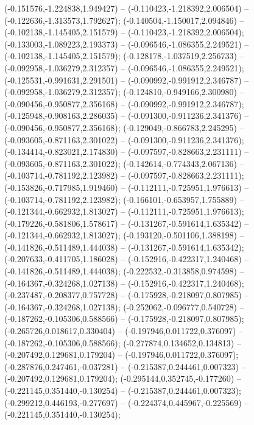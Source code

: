  (-0.151576,-1.224838,1.949427) -- (-0.110423,-1.218392,2.006504) -- (-0.122636,-1.313573,1.792627);
 (-0.140504,-1.150017,2.094846) -- (-0.102138,-1.145405,2.151579) -- (-0.110423,-1.218392,2.006504);
 (-0.133003,-1.089223,2.193373) -- (-0.096546,-1.086355,2.249521) -- (-0.102138,-1.145405,2.151579);
 (-0.128178,-1.037519,2.256733) -- (-0.092958,-1.036279,2.312357) -- (-0.096546,-1.086355,2.249521);
 (-0.125531,-0.991631,2.291501) -- (-0.090992,-0.991912,2.346787) -- (-0.092958,-1.036279,2.312357);
 (-0.124810,-0.949166,2.300980) -- (-0.090456,-0.950877,2.356168) -- (-0.090992,-0.991912,2.346787);
 (-0.125948,-0.908163,2.286035) -- (-0.091300,-0.911236,2.341376) -- (-0.090456,-0.950877,2.356168);
 (-0.129049,-0.866783,2.245295) -- (-0.093605,-0.871163,2.301022) -- (-0.091300,-0.911236,2.341376);
 (-0.134414,-0.823021,2.174830) -- (-0.097597,-0.828663,2.231111) -- (-0.093605,-0.871163,2.301022);
 (-0.142614,-0.774343,2.067136) -- (-0.103714,-0.781192,2.123982) -- (-0.097597,-0.828663,2.231111);
 (-0.153826,-0.717985,1.919460) -- (-0.112111,-0.725951,1.976613) -- (-0.103714,-0.781192,2.123982);
 (-0.166101,-0.653957,1.755889) -- (-0.121344,-0.662932,1.813027) -- (-0.112111,-0.725951,1.976613);
 (-0.179226,-0.581806,1.578617) -- (-0.131267,-0.591614,1.635342) -- (-0.121344,-0.662932,1.813027);
 (-0.193120,-0.501106,1.388198) -- (-0.141826,-0.511489,1.444038) -- (-0.131267,-0.591614,1.635342);
 (-0.207633,-0.411705,1.186028) -- (-0.152916,-0.422317,1.240468) -- (-0.141826,-0.511489,1.444038);
 (-0.222532,-0.313858,0.974598) -- (-0.164367,-0.324268,1.027138) -- (-0.152916,-0.422317,1.240468);
 (-0.237487,-0.208377,0.757728) -- (-0.175928,-0.218097,0.807985) -- (-0.164367,-0.324268,1.027138);
 (-0.252062,-0.096777,0.540728) -- (-0.187262,-0.105306,0.588566) -- (-0.175928,-0.218097,0.807985);
 (-0.265726,0.018617,0.330404) -- (-0.197946,0.011722,0.376097) -- (-0.187262,-0.105306,0.588566);
 (-0.277874,0.134652,0.134813) -- (-0.207492,0.129681,0.179204) -- (-0.197946,0.011722,0.376097);
 (-0.287876,0.247461,-0.037281) -- (-0.215387,0.244461,0.007323) -- (-0.207492,0.129681,0.179204);
 (-0.295144,0.352745,-0.177260) -- (-0.221145,0.351440,-0.130254) -- (-0.215387,0.244461,0.007323);
 (-0.299212,0.446193,-0.277697) -- (-0.224374,0.445967,-0.225569) -- (-0.221145,0.351440,-0.130254);
